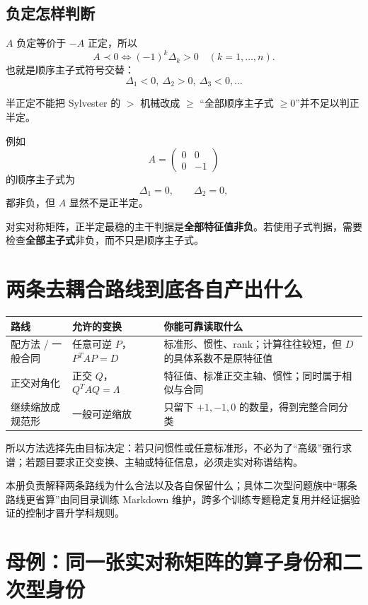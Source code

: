 \documentclass[11pt,a4paper]{ctexart}
\newcommand{\kw}[1]{\textbf{\color{deep}#1}}
\begin{document}
\subsection{负定怎样判断}

$A$ 负定等价于 $-A$ 正定，所以
\[
\boxed{A\prec0\iff (-1)^k\Delta_k>0\quad(k=1,\dots,n).}
\]
也就是顺序主子式符号交替：
\[
\Delta_1<0,\ \Delta_2>0,\ \Delta_3<0,\dots
\]

\begin{warnbox}{半正定不能把 Sylvester 的 $>$ 机械改成 $\ge$}
“全部顺序主子式 $\ge0$”并不足以判正半定。

例如
\[
A=\begin{pmatrix}0&0\\0&-1\end{pmatrix}
\]
的顺序主子式为
\[
\Delta_1=0,\qquad\Delta_2=0,
\]
都非负，但 $A$ 显然不是正半定。

对实对称矩阵，正半定最稳的主干判据是\kw{全部特征值非负}。若使用子式判据，需要检查\kw{全部主子式}非负，而不只是顺序主子式。
\end{warnbox}

\section{两条去耦合路线到底各自产出什么}

\begin{longtable}{L{3.0cm}L{4.3cm}L{\dimexpr\linewidth-7.8cm\relax}}
\toprule
\textbf{路线} & \textbf{允许的变换} & \textbf{你能可靠读取什么}\\
\midrule
配方法 / 一般合同 & 任意可逆 $P$，$P^TAP=D$ & 标准形、惯性、rank；计算往往较短，但 $D$ 的具体系数不是原特征值\\
正交对角化 & 正交 $Q$，$Q^TAQ=\Lambda$ & 特征值、标准正交主轴、惯性；同时属于相似与合同\\
继续缩放成规范形 & 一般可逆缩放 & 只留下 $+1,-1,0$ 的数量，得到完整合同分类\\
\bottomrule
\end{longtable}

所以方法选择先由目标决定：若只问惯性或任意标准形，不必为了“高级”强行求谱；若题目要求正交变换、主轴或特征信息，必须走实对称谱结构。

本册负责解释两条路线为什么合法以及各自保留什么；具体二次型问题族中“哪条路线更省算”由同目录训练 Markdown 维护，跨多个训练专题稳定复用并经证据验证的控制才晋升学科规则。

\section{母例：同一张实对称矩阵的算子身份和二次型身份}
\end{document}

